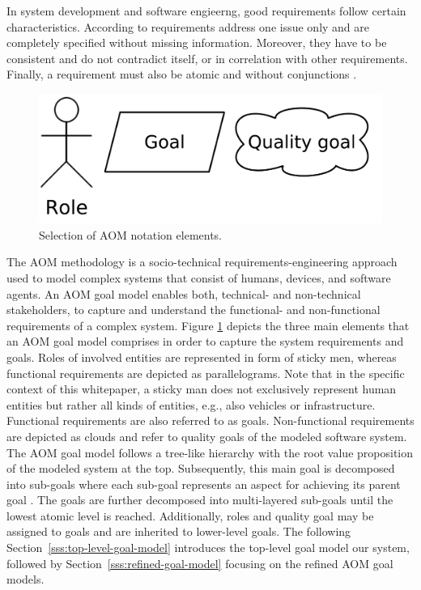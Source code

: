 \documentclass{llncs}
\begin{document}
{			In system development and software engieerng, good requirements follow certain characteristics. According to \cite{davis1993software}\cite{ieee1994ieee} requirements address one issue only and are completely specified without missing information. Moreover, they have to be consistent and do not contradict itself, or in correlation with other requirements. Finally, a requirement must also be atomic and without conjunctions \cite{norta2014reference}.

			\begin{figure}[H]
				\centering
				\includegraphics[scale=0.2]{Figures/20180426_AOM-notation.pdf}
				\caption{Selection of AOM notation elements.}	
				\label{fig:aom-notaion-elements}
			\end{figure}				
			The AOM methodology is a socio-technical requirements-engineering approach used to model complex systems that consist of humans, devices, and software agents. An AOM goal model enables both, technical- and non-technical stakeholders, to capture and understand the functional- and non-functional requirements of a complex system. Figure \ref{fig:aom-notaion-elements} depicts the three main elements that an AOM goal model comprises in order to capture the system requirements and goals. Roles of involved entities are represented in form of sticky men, whereas functional requirements are depicted as parallelograms. Note that in the specific context of this whitepaper, a sticky man does not exclusively represent human entities but rather all kinds of entities, e.g., also vehicles or infrastructure. Functional requirements are also referred to as goals. Non-functional requirements are depicted as clouds and refer to quality goals of the modeled software system. The AOM goal model follows a tree-like hierarchy with the root value proposition of the modeled system at the top. Subsequently, this main goal is decomposed into sub-goals where each sub-goal represents an aspect for achieving its parent goal \cite{marshall2014agent}. The goals are further decomposed into multi-layered sub-goals until the lowest atomic level is reached. Additionally, roles and quality goal may be assigned to goals and are inherited to lower-level goals. The following Section~\ref{sss:top-level-goal-model} introduces the top-level goal model our system, followed by Section~\ref{sss:refined-goal-model} focusing on the refined AOM goal models.

}
\end{document}
